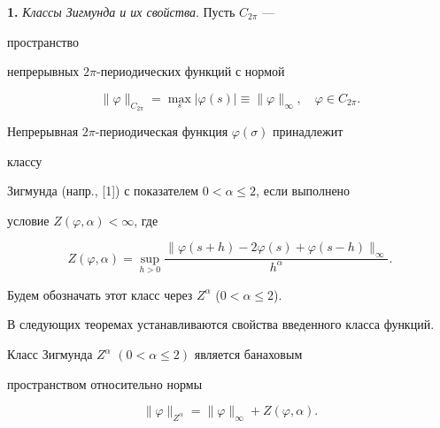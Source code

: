  


\date{} 




\pagestyle{plain} %


 




\maketitle 


\label{begin} 


 


 


 


{\bf 1.} {\it Классы Зигмунда и их свойства}. Пусть $C_{2\pi}$ ---


пространство 


непрерывных $2\pi$-пе\-ри\-о\-ди\-чес\-ких функций с нормой 


$$ 


\|\varphi\|_{C_{2\pi}}=\max_s|\varphi(s)|\equiv 


\|\varphi\|_\infty,\quad \varphi\in C_{2\pi}. 


$$ 


Непрерывная $2\pi$-периодическая функция $\varphi(\sigma)$ принадлежит 


классу 


Зигмунда (напр., [1]) с показателем $0<\alpha\le2$, если выполнено 


условие $Z(\varphi,\alpha)<\infty$, где 


$$ 


Z(\varphi,\alpha)=\sup_{h>0} 


\frac{\|\varphi(s+h)-2\varphi(s)+\varphi(s-h)\|_\infty}{h^\alpha}. 


$$ 


Будем обозначать этот класс через $Z^\alpha$ ($0<\alpha\le2$). 


 


В следующих теоремах устанавливаются свойства введенного класса функций. 


 


\begin{thm} 


Класс Зигмунда $Z^\alpha$ $(0<\alpha\le2)$ является банаховым 


пространством относительно нормы 


$$ 


\|\varphi\|_{Z^\alpha}=\|\varphi\|_\infty+Z(\varphi,\alpha). 


$$ 


\end{thm} 


